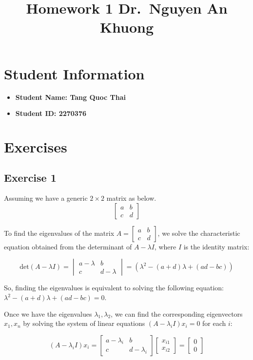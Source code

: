 \documentclass{article}
\author{}
\begin{document}
\title{Homework 1 \- Dr.\ Nguyen An Khuong}
\maketitle
\section{Student Information}
\begin{itemize}
    \item \bf{Student Name:} Tang Quoc Thai
    \item \bf{Student ID:} 2270376
\end{itemize}

\section{Exercises}
\subsection{Exercise 1}
Assuming we have a generic $2\times2$ matrix as below.
\[
    \begin{bmatrix}
        a & b \\
        c & d
    \end{bmatrix}
\]

To find the eigenvalues of the matrix \( A = \begin{bmatrix} a & b \\ c & d \end{bmatrix} \), we solve the characteristic equation obtained from the determinant of \( A - \lambda I \), where \( I \) is the identity matrix:

\[
    \text{det}(A - \lambda I) = \begin{vmatrix} a - \lambda & b \\ c & d - \lambda \end{vmatrix} = (\lambda^2 - (a+d)\lambda + (ad-bc))
\]

So, finding the eigenvalues is equivalent to solving the following equation: \( \lambda^2 - (a+d)\lambda + (ad-bc) = 0 \).

Once we have the eigenvalues \( \lambda_1, \lambda_2 \), we can find the corresponding eigenvectors \( x_1, x_n \) by solving the system of linear equations \( (A - \lambda_i I)x_i = 0 \) for each \( i \):

\[
    (A - \lambda_i I)x_i = \begin{bmatrix} a - \lambda_i & b \\ c & d - \lambda_i \end{bmatrix} \begin{bmatrix} x_{i1} \\ x_{i2} \end{bmatrix} = \begin{bmatrix} 0 \\ 0 \end{bmatrix}
\]
\end{document}
